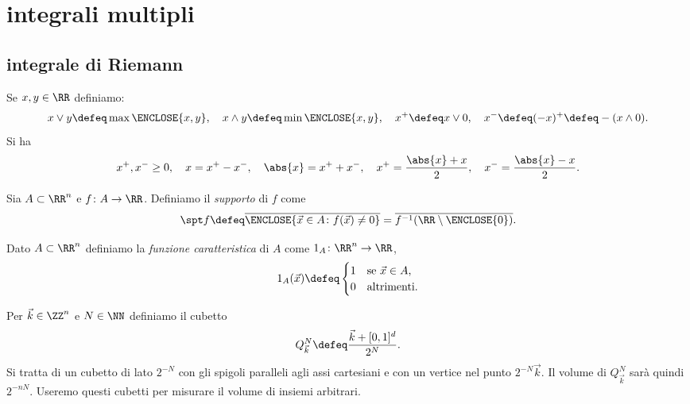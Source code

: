 \chapter{integrali multipli}

\section{integrale di Riemann}
Se $x,y\in \RR$ definiamo:
\[
    x \vee y \defeq \max\ENCLOSE{x,y},
    \quad
    x \wedge y \defeq \min\ENCLOSE{x,y},
    \quad
    x^+ \defeq x \vee 0,
    \quad
    x^- \defeq (-x)^+ \defeq -(x\wedge 0).
\]
Si ha
\[
    x^+,x^-\ge 0,
    \quad
    x = x^+ - x^-,
    \quad 
    \abs{x} = x^+ + x^-,
    \quad
    x^+ = \frac{\abs{x}+x}{2},
    \quad
    x^- = \frac{\abs{x}-x}{2}.
\]

Sia $A\subset \RR^n$ e $f\colon A \to \RR$. 
Definiamo il \emph{supporto} di $f$ come 
\[
 \spt f 
    \defeq \overline{\ENCLOSE{\vec x \in A \colon f(\vec x) \neq 0}}
    = \overline{f^{-1}(\RR\setminus\ENCLOSE{0})}.
\]

Dato $A\subset \RR^n$ definiamo la \emph{funzione caratteristica}
di $A$ come $1_A\colon \RR^n \to \RR$,
\[
  1_A(\vec x) \defeq \begin{cases}
    1 & \text{se $\vec x \in A$,}\\
    0 & \text{altrimenti.}
  \end{cases}
\]

Per $\vec k \in \ZZ^n$ e $N\in \NN$ definiamo 
il cubetto 
\[
  Q^N_{\vec k} \defeq \frac{\vec k + [0,1]^d}{2^N}.
\]
Si tratta di un cubetto di lato $2^{-N}$ con gli spigoli paralleli 
agli assi cartesiani e con un vertice nel punto $2^{-N} \vec k$.
Il volume di $Q^N_{\vec k}$ sarà quindi $2^{-nN}$.
Useremo questi cubetti per misurare il volume di insiemi arbitrari.

